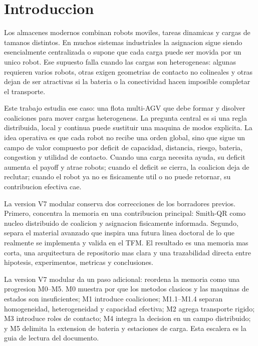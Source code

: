 ﻿\section{Introduccion}

Los almacenes modernos combinan robots moviles, tareas dinamicas y cargas de tamanos
distintos. En muchos sistemas industriales la asignacion sigue siendo esencialmente
centralizada o supone que cada carga puede ser movida por un unico robot. Ese supuesto
falla cuando las cargas son heterogeneas: algunas requieren varios robots, otras exigen
geometrias de contacto no colineales y otras dejan de ser atractivas si la bateria o la
conectividad hacen imposible completar el transporte.

Este trabajo estudia ese caso: una flota multi-AGV que debe formar y disolver
coaliciones para mover cargas heterogeneas. La pregunta central es si una regla
distribuida, local y continua puede sustituir una maquina de modos explicita. La idea
operativa es que cada robot no recibe una orden global, sino que sigue un campo de valor
compuesto por deficit de capacidad, distancia, riesgo, bateria, congestion y utilidad de
contacto. Cuando una carga necesita ayuda, su deficit aumenta el payoff y atrae robots;
cuando el deficit se cierra, la coalicion deja de reclutar; cuando el robot ya no es
fisicamente util o no puede retornar, su contribucion efectiva cae.

La version V7 modular conserva dos correcciones de los borradores previos. Primero,
concentra la memoria en una contribucion principal: Smith-QR como nucleo distribuido de
coalicion y asignacion fisicamente informada. Segundo, separa el material avanzado que
inspira una futura linea doctoral de lo que realmente se implementa y valida en el TFM.
El resultado es una memoria mas corta, una arquitectura de repositorio mas clara y una
trazabilidad directa entre hipotesis, experimentos, metricas y conclusiones.

La version V7 modular da un paso adicional: reordena la memoria como una progresion
M0--M5. M0 muestra por que los metodos clasicos y las maquinas de estados son
insuficientes; M1 introduce coaliciones; M1.1--M1.4 separan homogeneidad,
heterogeneidad y capacidad efectiva; M2 agrega transporte rigido; M3 introduce roles de
contacto; M4 integra la decision en un campo distribuido; y M5 delimita la extension de
bateria y estaciones de carga. Esta escalera es la guia de lectura del documento.
